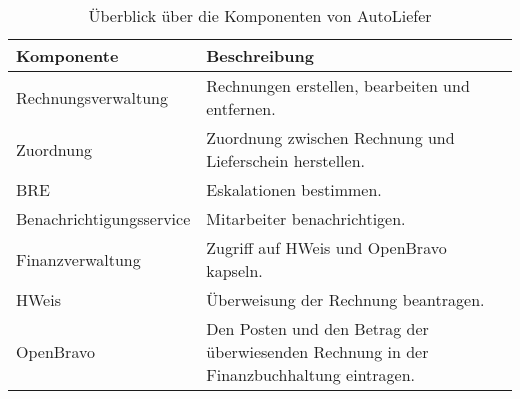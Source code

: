 \begin{table}[ht]
\centering
\caption{Überblick über die Komponenten von AutoLiefer}
\label{tab:KomponentenAutoLiefer}
\begin{tabularx}{\linewidth}{@{}lX@{}}
\toprule
Komponente               & Beschreibung                                                                             \\ \midrule
Rechnungsverwaltung      & Rechnungen erstellen, bearbeiten und entfernen.                                          \\
Zuordnung                & Zuordnung zwischen Rechnung und Lieferschein herstellen.                                 \\
BRE                      & Eskalationen bestimmen.                                                                  \\
Benachrichtigungsservice & Mitarbeiter benachrichtigen.                                                             \\
Finanzverwaltung         & Zugriff auf HWeis und OpenBravo kapseln.                                                                 \\
HWeis                    & Überweisung der Rechnung beantragen.                                                     \\
OpenBravo                & Den Posten und den Betrag der überwiesenden Rechnung in der Finanzbuchhaltung eintragen. \\ \bottomrule
\end{tabularx}
\end{table}
